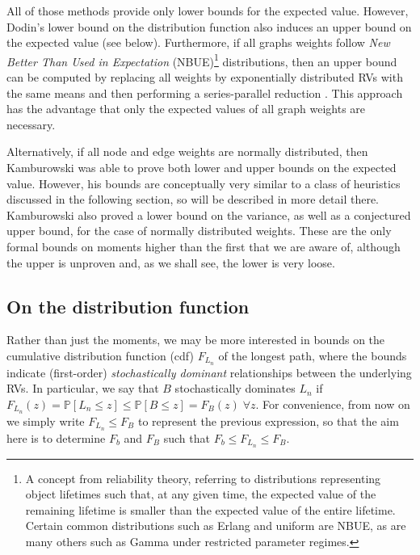 \documentclass[12pt]{article}
\def\P{\mathbb{P}}
\begin{document}
All of those methods provide only lower bounds for the expected value. However, Dodin's lower bound on the distribution function also induces an upper bound on the expected value \cite{dod85} (see below).  Furthermore, if all graphs weights follow {\em New Better Than Used in Expectation} (NBUE)\footnote{A concept from reliability theory, referring to distributions representing object lifetimes such that, at any given time, the expected value of the remaining lifetime is smaller than the expected value of the entire lifetime. Certain common distributions such as Erlang and uniform are NBUE, as are many others such as Gamma under restricted parameter regimes.} distributions, then an upper bound can be computed by replacing all weights by exponentially distributed RVs with the same means and then performing a series-parallel reduction \cite{kam85a, yaz91}. This approach has the advantage that only the expected values of all graph weights are necessary. 

Alternatively, if all node and edge weights are normally distributed, then Kamburowski \cite{kam85} was able to prove both lower and upper bounds on the expected value. However, his bounds are conceptually very similar to a class of heuristics discussed in the following section, so will be described in more detail there. Kamburowski also proved a lower bound on the variance, as well as a conjectured upper bound, for the case of normally distributed weights. These are the only formal bounds on moments higher than the first that we are aware of, although the upper is unproven and, as we shall see, the lower is very loose.

\subsection{On the distribution function}
\label{subsect.bounds_distribution}

Rather than just the moments, we may be more interested in bounds on the cumulative distribution function (cdf) $F_{L_n}$ of the longest path, where the bounds indicate (first-order) {\em stochastically dominant} relationships between the underlying RVs. In particular, we say that $B$ stochastically dominates $L_n$ if $F_{L_n}(z) = \P[L_n \leq z] \leq \P[B \leq z] = F_B(z) \; \forall z$. For convenience, from now on we simply write $F_{L_n} \leq F_B$ to represent the previous expression, so that the aim here is to determine $F_b$ and $F_B$ such that $F_b \leq F_{L_n} \leq F_B$.
\end{document}

